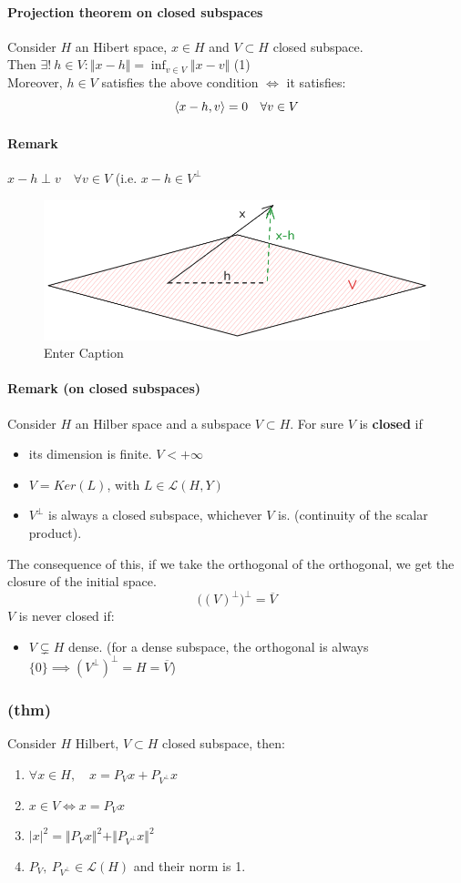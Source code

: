 \paragraph{Projection theorem on closed subspaces}
Consider $H$ an Hibert space, $x\in H$ and $V\subset H$ closed subspace.\\
Then $\exists ! \ h\in V:\Vert x-h\Vert =\inf_{v\in V} \Vert x-v\Vert $ (1)\\
Moreover, $h\in V$ satisfies the above condition $\iff$ it satisfies:
$$\langle {x-h} , {v} \rangle=0\quad \forall v\in V$$
\paragraph{Remark} $x-h\perp v \quad \forall v\in V$ (i.e. $x-h\in V^\perp$
\begin{figure}[H]
    \centering
    \includegraphics[width=0.5\linewidth]{image.png}
    \caption{Enter Caption}
    \label{fig:enter-label}
\end{figure}
\paragraph{Remark (on closed subspaces)}
Consider $H$ an Hilber space and a subspace $V\subset H$.
For sure $V$ is \textbf{closed} if 
\begin{itemize}
    \item its dimension is finite. $V<+\infty$
    \item $V=Ker(L)$, with $L\in \mathcal L(H,Y)$
    \item $V^\perp$ is always a closed subspace, whichever $V$ is. (continuity of the scalar product).
\end{itemize}
The consequence of this, if we take the orthogonal of the orthogonal, we get the closure of the initial space.
$$\Big ((V)^\perp\Big)^\perp =\overline V$$
$V$ is never closed if:
\begin{itemize}
    \item $V\subsetneq H$ dense. (for a dense subspace, the orthogonal is always $\{0\}\implies (V^\perp)^\perp =H=\overline V$)
\end{itemize}
\subsubsection{(thm)}
Consider $H$ Hilbert, $V\subset H$ closed subspace, then:
\begin{enumerate}
    \item $\forall x \in H, \quad x=P_Vx+P_{V^\perp}x$
    \item $x\in V\iff x=P_Vx$
    \item $|x|^2=\Vert P_Vx\Vert ^2+\Vert P_{V^\perp} x\Vert ^2$
    \item $P_V, \ P_{V^\perp}\in \mathcal L(H)$ and their norm is 1.
\end{enumerate}
